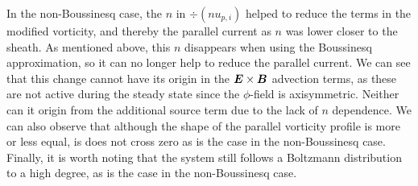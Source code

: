 In the non-Boussinesq case, the $n$ in $\div(nu_{p,i})$ helped to reduce the terms in the modified vorticity, and thereby the parallel current as $n$ was lower closer to the sheath.
As mentioned above, this $n$ disappears when using the Boussinesq approximation, so it can no longer help to reduce the parallel current.
We can see that this change cannot have its origin in the $\boldsymbol{E}\times\boldsymbol{B}$ advection terms, as these are not active during the steady state since the $\phi$-field is axisymmetric.
Neither can it origin from the additional source term due to the lack of $n$ dependence.
We can also observe that although the shape of the parallel vorticity profile is more or less equal, is does not cross zero as is the case in the non-Boussinesq case.
Finally, it is worth noting that the system still follows a Boltzmann distribution to a high degree, as is the case in the non-Boussinesq case.
%

